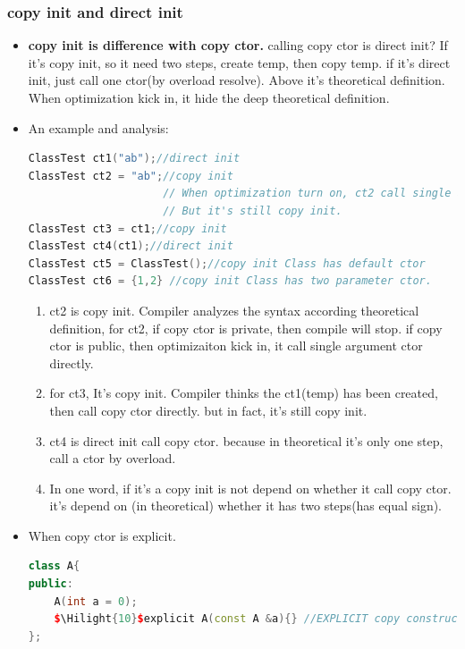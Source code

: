 \documentclass[a4paper,12pt,twoside]{book}
\newcommand{\Hilight}[1]{\makebox[0pt][l]{\color{yellow}\rule[-3pt]{#1em}{11pt}}}
\begin{document}
\subsubsection{copy init and direct init}
\begin{itemize}
	\item \textbf{copy init is difference with copy ctor.} calling copy ctor is  direct init? If it's copy init, so it need two steps, create temp, then copy temp.  if it's direct init, just call one ctor(by overload resolve). Above it's theoretical definition. When optimization kick in, it hide the deep theoretical definition.   
	
	\item An example and analysis:

\begin{lstlisting}[frame=single, language=c++]
ClassTest ct1("ab");//direct init
ClassTest ct2 = "ab";//copy init 
                     // When optimization turn on, ct2 call single argument directly
                     // But it's still copy init.
ClassTest ct3 = ct1;//copy init
ClassTest ct4(ct1);//direct init
ClassTest ct5 = ClassTest();//copy init Class has default ctor
ClassTest ct6 = {1,2} //copy init Class has two parameter ctor.
\end{lstlisting}

	\begin{enumerate}
		\item ct2 is copy init. Compiler analyzes the syntax according theoretical definition, for ct2, if copy ctor is private, then compile will stop. if copy ctor is public, then optimizaiton kick in, it call single argument ctor directly.
		
		\item for ct3, It's copy init. Compiler thinks the ct1(temp) has been created, then call copy ctor directly. but in fact, it's still copy init.
		
		\item ct4 is direct init call copy ctor. because in theoretical it's only one step, call a ctor by overload. 
		
		\item In one word, if it's a copy init is not depend on whether it call copy ctor.  it's depend on (in theoretical) whether it has two steps(has equal sign).
	\end{enumerate}

	\item  When copy ctor is explicit.
\begin{lstlisting}[frame=single, language=c++]
class A{
public:
	A(int a = 0);
	$\Hilight{10}$explicit A(const A &a){} //EXPLICIT copy constructor
};
	

\end{lstlisting}
\end{itemize}
\end{document}

